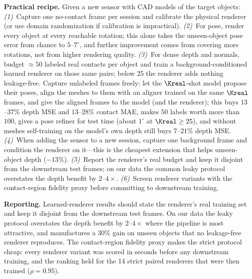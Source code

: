 \noindent\textbf{Practical recipe.}
Given a new sensor with CAD models of the target objects:
\emph{(1)}~Capture one no-contact frame per session and calibrate the physical renderer (or use domain randomization if calibration is impractical).
\emph{(2)}~For pose, render every object at every reachable rotation; this alone takes the unseen-object pose error from chance to $5$--$7^\circ$, and further improvement comes from covering more rotations, not from higher rendering quality.
\emph{(3)}~For dense depth and normals, budget $\approx\!50$ labeled real contacts per object and train a background-conditioned learned renderer on those same pairs; below $25$ the renderer adds nothing leakage-free. Capture unlabeled frames freely: let the $\Kreal$-shot model propose their poses, align the meshes to them with an aligner trained on the same $\Kreal$ frames, and give the aligned frames to the model (and the renderer); this buys $13$--$37\%$ depth MSE and $13$--$28\%$ contact MAE, makes $50$ labels worth more than $100$, gives a pose refiner for test time (about $1^\circ$ at $\Kreal\ge25$), and without meshes self-training on the model's own depth still buys $7$--$21\%$ depth MSE.
\emph{(4)}~When adding the sensor to a new session, capture one background frame and condition the renderer on it---this is the cheapest extension that helps unseen-object depth ($-13\%$).
\emph{(5)}~Report the renderer's real budget and keep it disjoint from the downstream test frames; on our data the common leaky protocol overstates the depth benefit by $2$--$4\times$.
\emph{(6)}~Screen renderer variants with the contact-region fidelity proxy before committing to downstream training.

\noindent\textbf{Reporting.}
Learned-renderer results should state the renderer's real training set and keep it disjoint from the downstream test frames. On our data the leaky protocol overstates the depth benefit by $2$--$4\times$ where the pipeline is most attractive, and manufactures a $30\%$ gain on unseen objects that no leakage-free renderer reproduces. The contact-region fidelity proxy makes the strict protocol cheap: every renderer variant was scored in seconds before any downstream training, and the ranking held for the 14 strict paired renderers that were then trained ($\rho=0.95$).

